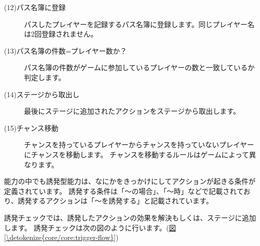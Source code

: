 \documentclass[letterpaper,10pt,dvipdfmx]{sphinxmanual}
\begin{document}
\begin{description}
\item[{(12)パス名簿に登録}] \leavevmode
パスしたプレイヤーを記録するパス名簿に登録します。同じプレイヤー名は2回登録されません。

\item[{(13)パス名簿の件数=プレイヤー数か？}] \leavevmode
パス名簿の件数がゲームに参加しているプレイヤーの数と一致しているか判定します。

\item[{(14)ステージから取出し}] \leavevmode
最後にステージに追加されたアクションをステージから取出します。

\item[{(15)チャンス移動}] \leavevmode
チャンスを持っているプレイヤーからチャンスを持っていないプレイヤーにチャンスを移動します。
チャンスを移動するルールはゲームによって異なります。

\end{description}
\label{\detokenize{core/core:trigger-check}}
能力の中でも誘発型能力は、なにかをきっかけにしてアクションが起きる条件が定義されています。
誘発する条件は「〜の場合」、「〜時」などで記載されており、誘発するアクションは「〜を誘発する」と記載されています。

誘発チェックでは、誘発したアクションの効果を解決もしくは、ステージに追加します。
誘発チェックは次の図のように行います。(\hyperref[\detokenize{core/core:trigger-flow}]{図 \ref{\detokenize{core/core:trigger-flow}}})
\end{document}
